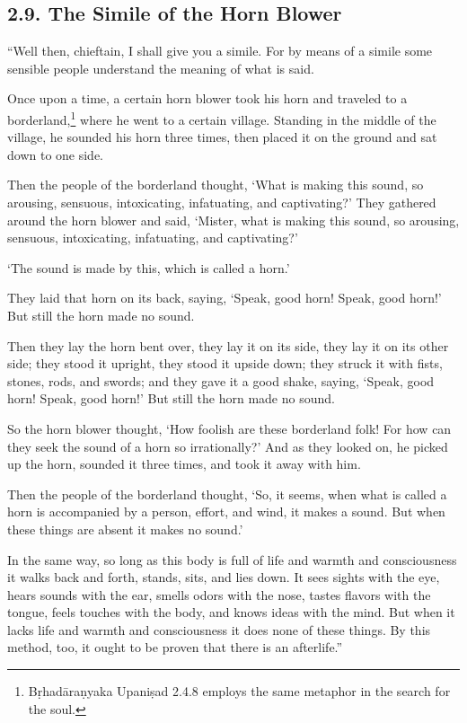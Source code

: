 \documentclass[12pt,openany]{book}%
\begin{document}
\subsection*{2.9. The Simile of the Horn Blower }

“Well then, chieftain, I shall give you a simile. For by means of a simile some sensible people understand the meaning of what is said. 

Once upon a time, a certain horn blower took his horn and traveled to a borderland,\footnote{\textsanskrit{Bṛhadāraṇyaka} \textsanskrit{Upaniṣad} 2.4.8 employs the same metaphor in the search for the soul. } where he went to a certain village. Standing in the middle of the village, he sounded his horn three times, then placed it on the ground and sat down to one side. 

Then the people of the borderland thought, ‘What is making this sound, so arousing, sensuous, intoxicating, infatuating, and captivating?’ They gathered around the horn blower and said, ‘Mister, what is making this sound, so arousing, sensuous, intoxicating, infatuating, and captivating?’ 

‘The sound is made by this, which is called a horn.’ 

They laid that horn on its back, saying, ‘Speak, good horn! Speak, good horn!’ But still the horn made no sound. 

Then they lay the horn bent over, they lay it on its side, they lay it on its other side; they stood it upright, they stood it upside down; they struck it with fists, stones, rods, and swords; and they gave it a good shake, saying, ‘Speak, good horn! Speak, good horn!’ But still the horn made no sound. 

So the horn blower thought, ‘How foolish are these borderland folk! For how can they seek the sound of a horn so irrationally?’ And as they looked on, he picked up the horn, sounded it three times, and took it away with him. 

Then the people of the borderland thought, ‘So, it seems, when what is called a horn is accompanied by a person, effort, and wind, it makes a sound. But when these things are absent it makes no sound.’ 

In the same way, so long as this body is full of life and warmth and consciousness it walks back and forth, stands, sits, and lies down. It sees sights with the eye, hears sounds with the ear, smells odors with the nose, tastes flavors with the tongue, feels touches with the body, and knows ideas with the mind. But when it lacks life and warmth and consciousness it does none of these things. By this method, too, it ought to be proven that there is an afterlife.” 
\end{document}
